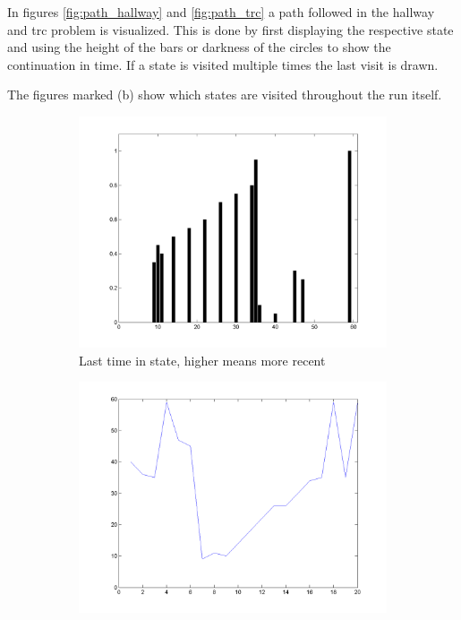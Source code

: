 \documentclass[10pt,a4paper]{article}
\begin{document}
In figures \ref{fig:path_hallway} and \ref{fig:path_trc} a path followed in the hallway and trc problem is visualized.
This is done by first displaying the respective state and using the height of the bars or darkness of the circles to show the continuation in time. 
If a state is visited multiple times the last visit is drawn.

The figures marked (b) show which states are visited throughout the run itself.

\begin{figure}
        \centering
        \begin{subfigure}{0.48\textwidth}
                \includegraphics[width=\textwidth]{Paths/hallway/plot-basic-part1-4096896640.png}
                \caption{Last time in state, higher means more recent}
                \label{fig:path_hallway_part1}
                \hspace{10pt}
        \end{subfigure}
        \quad
        \begin{subfigure}{0.48\textwidth}
        		\includegraphics[width=\textwidth]{Paths/hallway/plot-basic-part2-4096896640.png}

\end{subfigure}
\end{figure}
\end{document}
